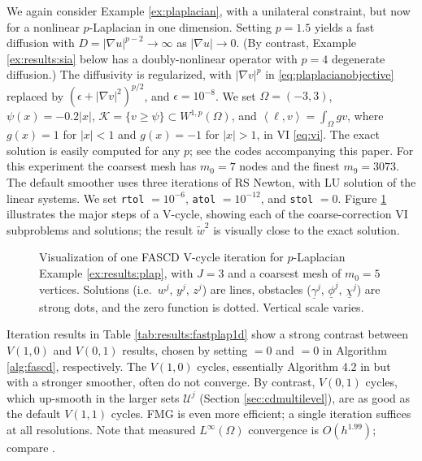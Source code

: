 \documentclass[review,hidelinks,onefignum,onetabnum,final]{siamart220329}  %
\newcommand{\eps}{\epsilon}
\newcommand{\grad}{\nabla}
\newcommand{\ip}[2]{\left<#1,#2\right>}
\begin{document}
\begin{example}  \label{ex:results:plap}
We again consider Example \ref{ex:plaplacian}, with a unilateral constraint, but now for a nonlinear $p$-Laplacian \cite{ChoeLewis1991} in one dimension.  Setting $p=1.5$ yields a fast diffusion with $D=|\grad u|^{p-2}\to \infty$ as $|\grad u|\to 0$.  (By contrast, Example \ref{ex:results:sia} below has a doubly-nonlinear operator with $p=4$ degenerate diffusion.)  The diffusivity is regularized, with $|\grad v|^p$ in \eqref{eq:plaplacianobjective} replaced by $\left(\eps + |\grad v|^2\right)^{p/2}$, and $\eps=10^{-8}$.  We set $\Omega=(-3,3)$, $\psi(x) = -0.2|x|$, $\mathcal{K} = \{v \ge \psi\} \subset W^{1,p}(\Omega)$, and $\ip\ell v = \int_\Omega g v$, where $g(x)=1$ for $|x|<1$ and $g(x)=-1$ for $|x|>1$, in VI \eqref{eq:vi}.  The exact solution is easily computed for any $p$; see the codes accompanying this paper.  For this experiment the coarsest mesh has $m_0=7$ nodes and the finest $m_9=3073$.  The default smoother uses three iterations of RS Newton, with LU solution of the linear systems.  We set \texttt{rtol} $= 10^{-6}$, \texttt{atol} $= 10^{-12}$, and \texttt{stol} $=0$.  Figure \ref{fig:imagesvcycle} illustrates the major steps of a V-cycle, showing each of the coarse-correction VI subproblems and solutions; the result $\tilde w^2$ is visually close to the exact solution.

\begin{figure}[ht]
\centering

\caption{Visualization of one FASCD V-cycle iteration for $p$-Laplacian Example \ref{ex:results:plap}, with $J=3$ and a coarsest mesh of $m_0=5$ vertices.  Solutions (i.e.~$w^j$, $y^j$, $z^j$) are lines, obstacles ($\underline{\gamma}^j$, $\underline{\phi}^j$, $\underline{\chi}^j$) are strong dots, and the zero function is dotted.  Vertical scale varies.}
\label{fig:imagesvcycle}
\end{figure}

Iteration results in Table \ref{tab:results:fastplap1d} show a strong contrast between $V(1,0)$ and $V(0,1)$ results, chosen by setting  $=0$ and  $=0$ in Algorithm \ref{alg:fascd}, respectively.  The $V(1,0)$ cycles, essentially Algorithm 4.2 in \cite{GraeserKornhuber2009} but with a stronger smoother, often do not converge.  By contrast, $V(0,1)$ cycles, which up-smooth in the larger sets $\mathcal{U}^j$ (Section \ref{sec:cdmultilevel}), are as good as the default $V(1,1)$ cycles.  FMG is even more efficient; a single iteration suffices at all resolutions.   Note that measured $L^\infty(\Omega)$ convergence is $O(h^{1.99})$; compare \cite{ChoeLewis1991}.
\end{example}
\end{document}

